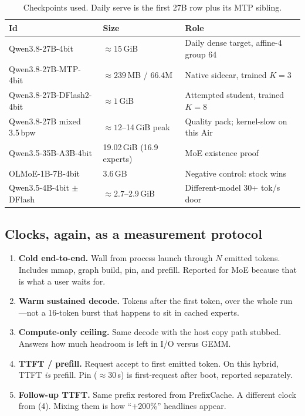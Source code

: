 \begin{table}[ht]
\centering
\caption{Checkpoints used. Daily serve is the first 27B row plus its MTP sibling.}
\label{tab:ckpts}
\begin{tabular}{@{}llp{6.4cm}@{}}
\toprule
Id & Size & Role \\
\midrule
Qwen3.8-27B-4bit & $\approx 15$\,GiB & Daily dense target, affine-4 group 64 \\
Qwen3.8-27B-MTP-4bit & $\approx 239$\,MB / 66.4M & Native sidecar, trained $K{=}3$ \\
Qwen3.8-27B-DFlash2-4bit & $\approx 1$\,GiB & Attempted student, trained $K{=}8$ \\
Qwen3.8-27B mixed 3.5\,bpw & $\approx 12$--14\,GiB peak & Quality pack; kernel-slow on this Air \\
Qwen3.5-35B-A3B-4bit & 19.02\,GiB (16.9 experts) & MoE existence proof \\
OLMoE-1B-7B-4bit & 3.6\,GB & Negative control: stock wins \\
Qwen3.5-4B-4bit $\pm$ DFlash & $\approx 2.7$--2.9\,GiB & Different-model 30+ tok/s door \\
\bottomrule
\end{tabular}
\end{table}

\subsection{Clocks, again, as a measurement protocol}

\begin{enumerate}[leftmargin=1.4em]
\item \textbf{Cold end-to-end.} Wall from process launch through $N$ emitted tokens. Includes mmap, graph build, pin, and prefill. Reported for MoE because that is what a user waits for.
\item \textbf{Warm sustained decode.} Tokens after the first token, over the whole run---not a 16-token burst that happens to sit in cached experts.
\item \textbf{Compute-only ceiling.} Same decode with the host copy path stubbed. Answers how much headroom is left in I/O versus GEMM.
\item \textbf{TTFT / prefill.} Request accept to first emitted token. On this hybrid, TTFT \emph{is} prefill. Pin ($\approx 30$\,s) is first-request after boot, reported separately.
\item \textbf{Follow-up TTFT.} Same prefix restored from PrefixCache. A different clock from (4). Mixing them is how ``${+}200\%$'' headlines appear.
\end{enumerate}

